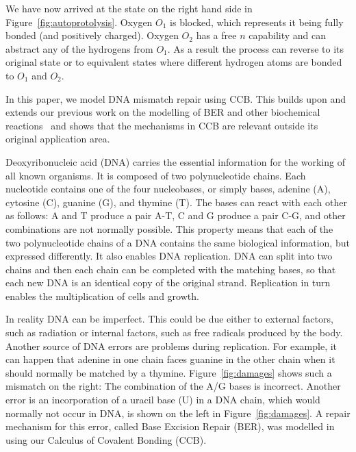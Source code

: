 \documentclass[review]{elsarticle}
\begin{document}
We have now arrived at the state on the right hand side in Figure~\ref{fig:autoprotolysis}.
Oxygen $O_1$ is blocked, which represents it being fully bonded (and positively charged).
Oxygen  $O_2$ has a free $n$ capability and can abstract any of the hydrogens from $O_1$. 
As a result the process can reverse to its original state or to equivalent states where
different hydrogen atoms are bonded to $O_1$ and $O_2$.

In this paper, we model DNA mismatch repair using CCB. This builds upon and extends our previous work on the modelling of BER and other biochemical reactions~\cite{10.1007/978-3-319-99498-7_8}  and shows that the mechanisms in CCB are relevant outside its original application area. 

Deoxyribonucleic acid (DNA) carries the essential information for the working of all known organisms. It is composed of two polynucleotide chains. Each nucleotide contains one of the four nucleobases, or simply bases,  adenine (A), cytosine (C), guanine (G), and thymine (T). 
The bases can react with each other as follows: A and T produce a pair A-T, C and G produce a pair C-G,
and other combinations are not normally possible. This property means that each of the two polynucleotide chains of a DNA contains the same biological information, but expressed differently. It also enables DNA replication. 
DNA can split into two chains and then each chain can be completed with the matching bases, so that each new DNA is an identical copy of the original strand. Replication in turn enables the multiplication of cells and growth.

In reality DNA can be imperfect. This could be due either to external factors, such as radiation 
or internal factors, such as free radicals produced by the body. Another source of DNA errors are problems during replication. For example, it can happen that adenine in one chain faces guanine in the other chain when it should normally be matched by a thymine. Figure~\ref{fig:damages} shows such a mismatch on the right: The combination of the A/G bases is incorrect. Another error is an incorporation of a uracil base (U) in a DNA chain, which would normally not occur in DNA, is shown on the left in Figure~\ref{fig:damages}. A repair mechanism for this error, called Base Excision Repair (BER), was modelled in \cite{10.1007/978-3-319-99498-7_8} using our Calculus of Covalent Bonding (CCB).
\end{document}
